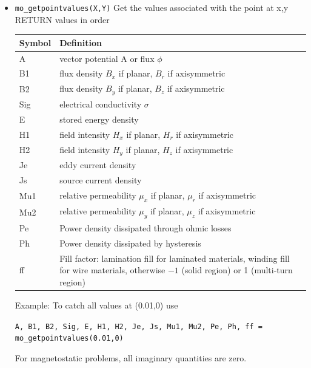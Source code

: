 \begin{itemize}
\item{\tt mo\_getpointvalues(X,Y)}
Get the values associated with the point at x,y RETURN values in
order
\begin{center}
\begin{tabular}{ll} \hline
Symbol & Definition \\ \hline
 A & vector potential A or flux $\phi$ \\
 B1 & flux density $B_x$ if planar, $B_r$ if axisymmetric \\
 B2 & flux density $B_y$ if planar, $B_z$ if axisymmetric \\
 Sig & electrical conductivity $\sigma$ \\
 E & stored energy density\\
 H1 & field intensity $H_x$ if planar, $H_r$ if axisymmetric \\
 H2 & field intensity $H_y$ if planar, $H_z$ if axisymmetric \\
 Je & eddy current density \\
 Js & source current density\\
 Mu1 & relative permeability $\mu_x$ if planar, $\mu_r$ if axisymmetric \\
 Mu2 & relative permeability $\mu_y$ if planar, $\mu_z$ if axisymmetric \\
 Pe & Power density dissipated through ohmic losses \\
 Ph & Power density dissipated by hysteresis \\
 ff & Fill factor: lamination fill for laminated materials, winding fill for wire materials, otherwise $-1$ (solid region) or 1 (multi-turn region) \\ \hline
 \end{tabular}
\end{center}

Example: To catch all values at (0.01,0) use

{\tt A, B1, B2, Sig, E, H1, H2, Je, Js, Mu1, Mu2, Pe, Ph, ff = mo\_getpointvalues(0.01,0)}

For magnetostatic problems, all imaginary quantities are zero.


\end{itemize}
